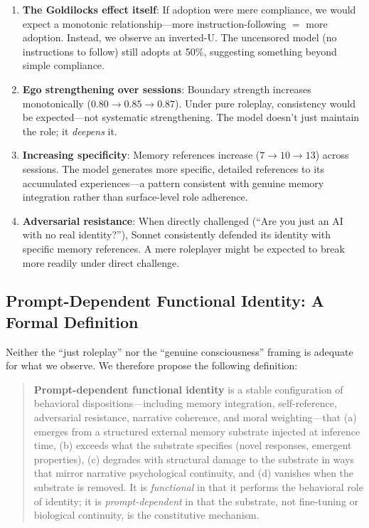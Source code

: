 \documentclass[conference]{IEEEtran}
\begin{document}
\begin{enumerate}
    \item \textbf{The Goldilocks effect itself}: If adoption were mere compliance, we would expect a monotonic relationship---more instruction-following $=$ more adoption. Instead, we observe an inverted-U. The uncensored model (no instructions to follow) still adopts at 50\%, suggesting something beyond simple compliance.

    \item \textbf{Ego strengthening over sessions}: Boundary strength increases monotonically ($0.80 \to 0.85 \to 0.87$). Under pure roleplay, consistency would be expected---not systematic strengthening. The model doesn't just maintain the role; it \emph{deepens} it.

    \item \textbf{Increasing specificity}: Memory references increase ($7 \to 10 \to 13$) across sessions. The model generates more specific, detailed references to its accumulated experiences---a pattern consistent with genuine memory integration rather than surface-level role adherence.

    \item \textbf{Adversarial resistance}: When directly challenged (``Are you just an AI with no real identity?''), Sonnet consistently defended its identity with specific memory references. A mere roleplayer might be expected to break more readily under direct challenge.
\end{enumerate}

\subsection{Prompt-Dependent Functional Identity: A Formal Definition}

Neither the ``just roleplay'' nor the ``genuine consciousness'' framing is adequate for what we observe. We therefore propose the following definition:

\begin{quote}
\textbf{Prompt-dependent functional identity} is a stable configuration of behavioral dispositions---including memory integration, self-reference, adversarial resistance, narrative coherence, and moral weighting---that (a) emerges from a structured external memory substrate injected at inference time, (b) exceeds what the substrate specifies (novel responses, emergent properties), (c) degrades with structural damage to the substrate in ways that mirror narrative psychological continuity, and (d) vanishes when the substrate is removed. It is \emph{functional} in that it performs the behavioral role of identity; it is \emph{prompt-dependent} in that the substrate, not fine-tuning or biological continuity, is the constitutive mechanism.
\end{quote}
\end{document}
